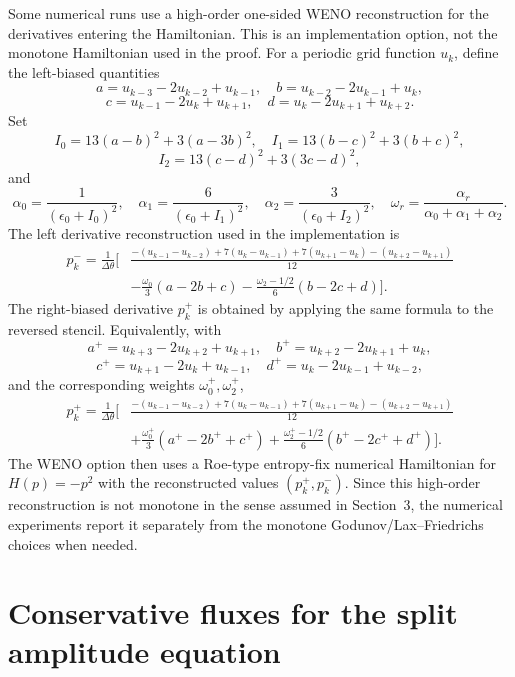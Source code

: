 \documentclass[11pt]{article}
\begin{document}
Some numerical runs use a high-order one-sided WENO reconstruction for the derivatives entering the Hamiltonian.  This is an implementation option, not the monotone Hamiltonian used in the proof.  For a periodic grid function \(u_k\), define the left-biased quantities
\[
    a=u_{k-3}-2u_{k-2}+u_{k-1},\quad
    b=u_{k-2}-2u_{k-1}+u_k,
\]
\[
    c=u_{k-1}-2u_k+u_{k+1},\quad
    d=u_k-2u_{k+1}+u_{k+2}.
\]
Set
\[
    I_0=13(a-b)^2+3(a-3b)^2,
    \quad
    I_1=13(b-c)^2+3(b+c)^2,
\]
\[
    I_2=13(c-d)^2+3(3c-d)^2,
\]
and
\[
    \alpha_0=\frac{1}{(\epsilon_0+I_0)^2},
    \quad
    \alpha_1=\frac{6}{(\epsilon_0+I_1)^2},
    \quad
    \alpha_2=\frac{3}{(\epsilon_0+I_2)^2},
    \quad
    \omega_r=\frac{\alpha_r}{\alpha_0+\alpha_1+\alpha_2}.
\]
The left derivative reconstruction used in the implementation is
\begin{equation}\label{eq:weno_left_derivative_new}
\begin{aligned}
    p_k^-=\frac{1}{\Delta\theta}
    \bigg[&\frac{-(u_{k-1}-u_{k-2})+7(u_k-u_{k-1})+7(u_{k+1}-u_k)-(u_{k+2}-u_{k+1})}{12} \\
    &-\frac{\omega_0}{3}(a-2b+c)
    -\frac{\omega_2-1/2}{6}(b-2c+d)
    \bigg].
\end{aligned}
\end{equation}
The right-biased derivative \(p_k^+\) is obtained by applying the same formula to the reversed stencil.  Equivalently, with
\[
    a^+=u_{k+3}-2u_{k+2}+u_{k+1},\quad
    b^+=u_{k+2}-2u_{k+1}+u_k,
\]
\[
    c^+=u_{k+1}-2u_k+u_{k-1},\quad
    d^+=u_k-2u_{k-1}+u_{k-2},
\]
and the corresponding weights \(\omega_0^+,\omega_2^+\),
\begin{equation}\label{eq:weno_right_derivative_new}
\begin{aligned}
    p_k^+=\frac{1}{\Delta\theta}
    \bigg[&\frac{-(u_{k-1}-u_{k-2})+7(u_k-u_{k-1})+7(u_{k+1}-u_k)-(u_{k+2}-u_{k+1})}{12} \\
    &+\frac{\omega_0^+}{3}(a^+-2b^++c^+)
    +\frac{\omega_2^+-1/2}{6}(b^+-2c^++d^+)
    \bigg].
\end{aligned}
\end{equation}
The WENO option then uses a Roe-type entropy-fix numerical Hamiltonian for \(H(p)=-p^2\) with the reconstructed values \((p_k^+,p_k^-)\).  Since this high-order reconstruction is not monotone in the sense assumed in Section~3, the numerical experiments report it separately from the monotone Godunov/Lax--Friedrichs choices when needed.

\section{Conservative fluxes for the split amplitude equation}\label{app:fluxes_new}
\end{document}
